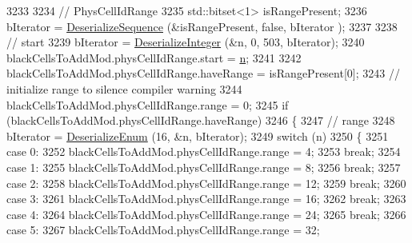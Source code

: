 \begin{DoxyCode}
3233 
3234                       \textcolor{comment}{// PhysCellIdRange}
3235                       std::bitset<1> isRangePresent;
3236                       bIterator = \hyperlink{classns3_1_1Asn1Header_a58c68bb97ba3fe2e8fcdd7c208d672b2}{DeserializeSequence} (&isRangePresent, \textcolor{keyword}{false}, bIterator
      );
3237 
3238                       \textcolor{comment}{// start}
3239                       bIterator = \hyperlink{classns3_1_1Asn1Header_a49802c9af30018b078150e866b6ecae2}{DeserializeInteger} (&n, 0, 503, bIterator);
3240                       blackCellsToAddMod.physCellIdRange.start = \hyperlink{namespacesample-rng-plot_aeb5ee5c431e338ef39b7ac5431242e1d}{n};
3241 
3242                       blackCellsToAddMod.physCellIdRange.haveRange = isRangePresent[0];
3243                       \textcolor{comment}{// initialize range to silence compiler warning}
3244                       blackCellsToAddMod.physCellIdRange.range = 0;
3245                       \textcolor{keywordflow}{if} (blackCellsToAddMod.physCellIdRange.haveRange)
3246                         \{
3247                           \textcolor{comment}{// range}
3248                           bIterator = \hyperlink{classns3_1_1Asn1Header_a4fcc253e0eec3483c775b005c1875f2d}{DeserializeEnum} (16, &n, bIterator);
3249                           \textcolor{keywordflow}{switch} (n)
3250                             \{
3251                             \textcolor{keywordflow}{case} 0:
3252                               blackCellsToAddMod.physCellIdRange.range = 4;
3253                               \textcolor{keywordflow}{break};
3254                             \textcolor{keywordflow}{case} 1:
3255                               blackCellsToAddMod.physCellIdRange.range = 8;
3256                               \textcolor{keywordflow}{break};
3257                             \textcolor{keywordflow}{case} 2:
3258                               blackCellsToAddMod.physCellIdRange.range = 12;
3259                               \textcolor{keywordflow}{break};
3260                             \textcolor{keywordflow}{case} 3:
3261                               blackCellsToAddMod.physCellIdRange.range = 16;
3262                               \textcolor{keywordflow}{break};
3263                             \textcolor{keywordflow}{case} 4:
3264                               blackCellsToAddMod.physCellIdRange.range = 24;
3265                               \textcolor{keywordflow}{break};
3266                             \textcolor{keywordflow}{case} 5:
3267                               blackCellsToAddMod.physCellIdRange.range = 32;

\end{DoxyCode}
